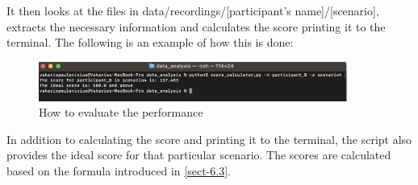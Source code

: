 It then looks at the files in data/recordings/[participant's name]/[scenario], extracts the necessary information and calculates the score printing it to the terminal. The following is an example of how this is done:

\begin{figure} [h]
    \centering
    \includegraphics[width = 0.9\textwidth]{research_paper/Images/score_calculation.png}
    \caption{How to evaluate the performance}
\end{figure}

In addition to calculating the score and printing it to the terminal, the script also provides the ideal score for that particular scenario. The scores are calculated based on the formula introduced in \autoref{sect-6.3}.
